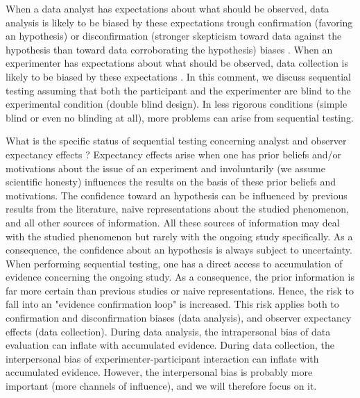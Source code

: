 \documentclass[a4paper,man,natbib,floatsintext,donotrepeattitle]{apa6}
\begin{document}
When a data analyst has expectations about what should be observed, data analysis is likely to be biased by these expectations trough confirmation (favoring an hypothesis) or disconfirmation (stronger skepticism toward data against the hypothesis than toward data corroborating the hypothesis) biases \citep{lilienfeld_blind_2017}. When an experimenter has expectations about what should be observed, data collection is likely to be biased by these expectations \citep{orne_social_1962,rosenthal_social_1963,rosenthal_experimenter_1964,tuyttens_opinion_2016,zoble_interaction_1969}.
In this comment, we discuss sequential testing assuming that both the participant and the experimenter are blind to the experimental condition (double blind design). In less rigorous conditions (simple blind or even no blinding at all), more problems can arise from sequential testing. \par

What is the specific status of sequential testing concerning analyst and observer expectancy effects ? Expectancy effects arise when one has prior beliefs and/or motivations about the issue of an experiment and involuntarily (we assume scientific honesty) influences the results on the basis of these prior beliefs and motivations. The confidence toward an hypothesis can be influenced by previous results from the literature, naive representations about the studied phenomenon, and all other sources of information. All these sources of information may deal with the studied phenomenon but rarely  with the ongoing study specifically. As a consequence, the confidence about an hypothesis is always subject to uncertainty. When performing sequential testing, one has a direct access to accumulation of evidence concerning the ongoing study. As a consequence, the prior information is far more certain than previous studies or naive representations. Hence, the risk to fall into an "evidence confirmation loop" is increased. This risk applies both to confirmation and disconfirmation biases (data analysis), and observer expectancy effects (data collection). During data analysis, the intrapersonal bias of data evaluation can inflate with accumulated evidence. During data collection, the interpersonal bias of experimenter-participant interaction can inflate with accumulated evidence. However, the interpersonal bias is probably more important (more channels of influence), and we will therefore focus on it. \par
\end{document}
